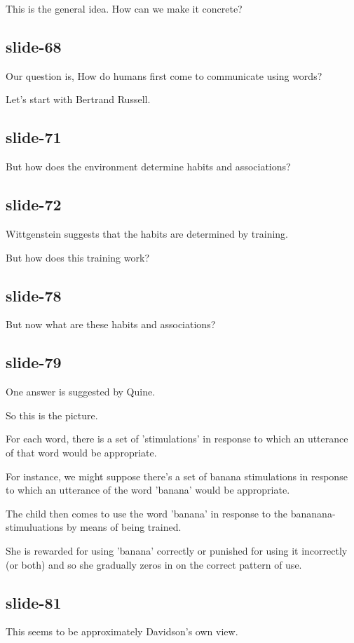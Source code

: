 \documentclass[12pt,\papersize]{extarticle}
\begin{document}
This is the general idea.  How can we make it concrete?
 
\subsection{slide-68}
Our question is, How do humans first come to communicate using words?
 
Let's start with Bertrand Russell.
 
\subsection{slide-71}
But how does the environment determine habits and associations?
 
\subsection{slide-72}
Wittgenstein suggests that the habits are determined by training.
 
But how does this training work?
 
\subsection{slide-78}
But now what are these habits and associations?
 
\subsection{slide-79}
One answer is suggested by Quine.
 
So this is the picture.
 
For each word, there is a set of 'stimulations' in response to which an utterance of that word would be appropriate.
 
For instance, we might suppose there's a set of banana stimulations in response to which an utterance of the word 'banana' would be appropriate.
 
The child then comes to use the word 'banana' in response to the bananana-stimuluations by means of being trained.
 
She is rewarded for using 'banana' correctly or punished for using it incorrectly (or both) and so she gradually zeros in on the correct pattern of use.
 
\subsection{slide-81}
This seems to be approximately Davidson's own view.
 
\end{document}
